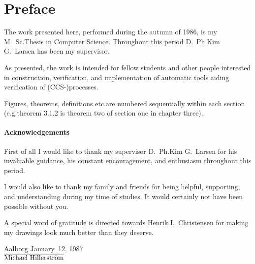 \chapter*{Preface}
\vskip-1cm
%
\noindent
The work presented here, performed during the autumn of 1986, is my
M.~Sc.\@ Thesis in Computer Science. Throughout this period D.~Ph.\@ Kim G.~Larsen has been my supervisor.

As presented, the work is intended for fellow students and other people interested
in construction, verification, and implementation of automatic tools aiding verification of (CCS-)processes.

Figures, theorems, definitions etc.\@ are numbered sequentially within each section (e.g.\@ theorem 3.1.2 is theorem two of section one in chapter three).

\subsubsection*{Acknowledgements}
First of all I would like to thank my supervisor D.~Ph.\@ Kim G.~Larsen for his invaluable guidance, his constant encouragement, and enthusiasm throughout this period.

I would also like to thank my family and friends for being helpful, supporting, and understanding during my time of studies. It would certainly not have been possible without you.

A special word of gratitude is directed towards Henrik I.~Christensen for making my drawings look much better than they deserve.

\begin{center}
Aalborg January~12, 1987\\[1.3cm]

$\overline{\hbox{Michael Hillerstr\"om}}$
\end{center}

